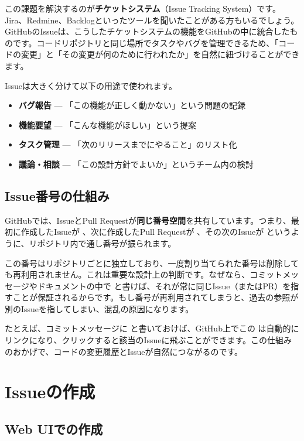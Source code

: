この課題を解決するのが\textbf{チケットシステム}（Issue Tracking System）です。Jira、Redmine、Backlogといったツールを聞いたことがある方もいるでしょう。GitHubのIssueは、こうしたチケットシステムの機能をGitHubの中に統合したものです。コードリポジトリと同じ場所でタスクやバグを管理できるため、「コードの変更」と「その変更が何のために行われたか」を自然に紐づけることができます。

Issueは大きく分けて以下の用途で使われます。

\begin{itemize}
  \item \textbf{バグ報告} --- 「この機能が正しく動かない」という問題の記録
  \item \textbf{機能要望} --- 「こんな機能がほしい」という提案
  \item \textbf{タスク管理} --- 「次のリリースまでにやること」のリスト化
  \item \textbf{議論・相談} --- 「この設計方針でよいか」というチーム内の検討
\end{itemize}

\subsection{Issue番号の仕組み}

GitHubでは、IssueとPull Requestが\textbf{同じ番号空間}を共有しています。つまり、最初に作成したIssueが 、次に作成したPull Requestが 、その次のIssueが  というように、リポジトリ内で通し番号が振られます。

この番号はリポジトリごとに独立しており、一度割り当てられた番号は削除しても再利用されません。これは重要な設計上の判断です。なぜなら、コミットメッセージやドキュメントの中で  と書けば、それが常に同じIssue（またはPR）を指すことが保証されるからです。もし番号が再利用されてしまうと、過去の参照が別のIssueを指してしまい、混乱の原因になります。

たとえば、コミットメッセージに  と書いておけば、GitHub上でこの  は自動的にリンクになり、クリックすると該当のIssueに飛ぶことができます。この仕組みのおかげで、コードの変更履歴とIssueが自然につながるのです。

\section{Issueの作成}

\subsection{Web UIでの作成}

